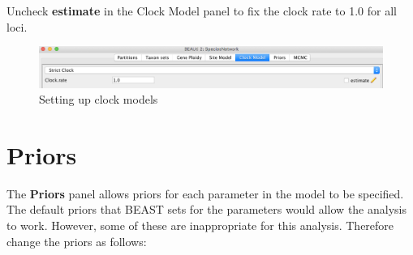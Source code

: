 \documentclass[11pt]{article}
\begin{document}
Uncheck {\bf estimate} in the Clock Model panel to fix the clock rate to 1.0 for all loci.
\begin{figure}[h]
\center
\includegraphics[width=1.0\textwidth]{figs/fig6_clockmodel}
\caption{Setting up clock models}
\label{fig_clockmodel}
\end{figure}

\section*{Priors}

The {\bf Priors} panel allows priors for each parameter in the model to be specified. The default priors that BEAST sets for the parameters would allow the analysis to work. However, some of these are inappropriate for this analysis. Therefore change the priors as follows:





\end{document}
